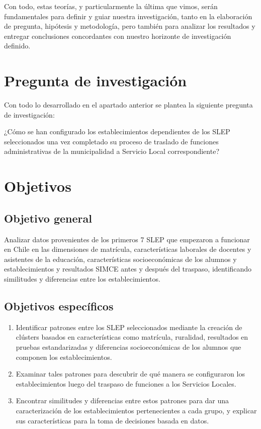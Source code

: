 \documentclass[
  12pt,
  letterpaper,
]{article}
\begin{document}
Con todo, estas teorías, y particularmente la última que vimos, serán fundamentales para definir y guiar nuestra investigación, tanto en la elaboración de pregunta, hipótesis y metodología, pero también para analizar los resultados y entregar conclusiones concordantes con nuestro horizonte de investigación definido.

\newpage

\section{Pregunta de investigación}\label{pregunta-de-investigaciuxf3n}

Con todo lo desarrollado en el apartado anterior se plantea la siguiente pregunta de investigación:

¿Cómo se han configurado los establecimientos dependientes de los SLEP seleccionados una vez completado su proceso de traslado de funciones administrativas de la municipalidad a Servicio Local correspondiente?

\newpage

\section{Objetivos}\label{objetivos}

\subsection{Objetivo general}\label{objetivo-general}

Analizar datos provenientes de los primeros 7 SLEP que empezaron a funcionar en Chile en las dimensiones de matrícula, características laborales de docentes y asistentes de la educación, características socioeconómicas de los alumnos y establecimientos y resultados SIMCE antes y después del traspaso, identificando similitudes y diferencias entre los establecimientos.

\subsection{Objetivos específicos}\label{objetivos-especuxedficos}

\begin{enumerate}
\def\labelenumi{\arabic{enumi}.}
\item
  Identificar patrones entre los SLEP seleccionados mediante la creación de clústers basados en características como matrícula, ruralidad, resultados en pruebas estandarizadas y diferencias socioeconómicas de los alumnos que componen los establecimientos.
\item
  Examinar tales patrones para descubrir de qué manera se configuraron los establecimientos luego del traspaso de funciones a los Servicios Locales.
\item
  Encontrar similitudes y diferencias entre estos patrones para dar una caracterización de los establecimientos pertenecientes a cada grupo, y explicar sus características para la toma de decisiones basada en datos.
\end{enumerate}
\end{document}
